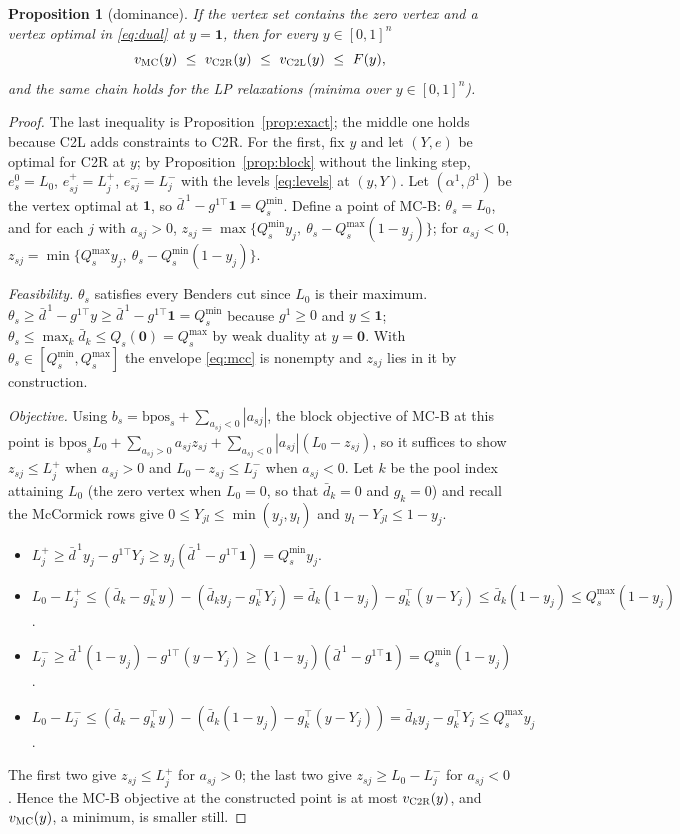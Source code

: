 \documentclass[11pt]{article}
\newtheorem{proposition}{Proposition}
\newcommand{\bpos}{\mathrm{bpos}}
\newcommand{\ad}{\bar d}
\newcommand{\T}{^{\top}}
\begin{document}
\begin{proposition}[dominance]\label{prop:dom}
If the vertex set contains the zero vertex and a vertex optimal in \eqref{eq:dual} at $y = \mathbf 1$, then for
every $y\in[0,1]^n$
\[
v_{\textsc{MC}}(y)\ \le\ v_{\textsc{C2R}}(y)\ \le\ v_{\textsc{C2L}}(y)\ \le\ F(y),
\]
and the same chain holds for the LP relaxations (minima over $y\in[0,1]^n$).
\end{proposition}
\begin{proof}
The last inequality is Proposition~\ref{prop:exact}; the middle one holds because \textsc{C2L} adds constraints
to \textsc{C2R}. For the first, fix $y$ and let $(Y,e)$ be optimal for \textsc{C2R} at $y$; by
Proposition~\ref{prop:block} without the linking step, $e^0_s = L_0$, $e^+_{sj} = L^+_j$, $e^-_{sj} = L^-_j$ with the
levels \eqref{eq:levels} at $(y,Y)$. Let $(\alpha^1,\beta^1)$ be the vertex optimal at $\mathbf 1$, so
$\ad^{\,1} - g^{1\top}\mathbf 1 = Q_s^{\min}$. Define a point of \textsc{MC-B}: $\theta_s = L_0$, and for each
$j$ with $a_{sj}>0$, $z_{sj} = \max\{Q_s^{\min}y_j,\ \theta_s - Q_s^{\max}(1-y_j)\}$; for $a_{sj}<0$,
$z_{sj} = \min\{Q_s^{\max}y_j,\ \theta_s - Q_s^{\min}(1-y_j)\}$.

\emph{Feasibility.} $\theta_s$ satisfies every Benders cut since $L_0$ is their maximum. $\theta_s\ge
\ad^{\,1} - g^{1\top}y\ge \ad^{\,1} - g^{1\top}\mathbf 1 = Q_s^{\min}$ because $g^1\ge0$ and $y\le\mathbf 1$;
$\theta_s\le\max_k \ad_k\le Q_s(\mathbf 0) = Q_s^{\max}$ by weak duality at $y = \mathbf 0$. With
$\theta_s\in[Q_s^{\min},Q_s^{\max}]$ the envelope \eqref{eq:mcc} is nonempty and $z_{sj}$ lies in it by
construction.

\emph{Objective.} Using $b_s = \bpos_s + \sum_{a_{sj}<0}|a_{sj}|$, the block objective of \textsc{MC-B} at this
point is $\bpos_s L_0 + \sum_{a_{sj}>0}a_{sj}z_{sj} + \sum_{a_{sj}<0}|a_{sj}|(L_0 - z_{sj})$, so it suffices to show
$z_{sj}\le L^+_j$ when $a_{sj}>0$ and $L_0 - z_{sj}\le L^-_j$ when $a_{sj}<0$. Let $k$ be the pool index attaining $L_0$ (the zero vertex when $L_0 = 0$, so that $\ad_k = 0$ and
$g_k = 0$) and recall the McCormick rows give $0\le Y_{jl}\le \min(y_j,y_l)$ and $y_l - Y_{jl}\le 1-y_j$.
\begin{itemize}[nosep]
\item $L^+_j\ge \ad^{\,1}y_j - g^{1\top}Y_j\ge y_j(\ad^{\,1} - g^{1\top}\mathbf 1) = Q_s^{\min}y_j$.
\item $L_0 - L^+_j\le (\ad_k - g_k\T y) - (\ad_ky_j - g_k\T Y_j) = \ad_k(1-y_j) -
      g_k\T(y - Y_j)\le \ad_k(1-y_j)\le Q_s^{\max}(1-y_j)$.
\item $L^-_j\ge \ad^{\,1}(1-y_j) - g^{1\top}(y-Y_j)\ge (1-y_j)(\ad^{\,1} - g^{1\top}\mathbf 1) = Q_s^{\min}(1-y_j)$.
\item $L_0 - L^-_j\le (\ad_k - g_k\T y) - (\ad_k(1-y_j) - g_k\T(y-Y_j)) = \ad_ky_j -
      g_k\T Y_j\le Q_s^{\max}y_j$.
\end{itemize}
The first two give $z_{sj}\le L^+_j$ for $a_{sj}>0$; the last two give $z_{sj}\ge L_0 - L^-_j$ for $a_{sj}<0$.
Hence the \textsc{MC-B} objective at the constructed point is at most $v_{\textsc{C2R}}(y)$, and
$v_{\textsc{MC}}(y)$, a minimum, is smaller still.
\end{proof}
\end{document}

